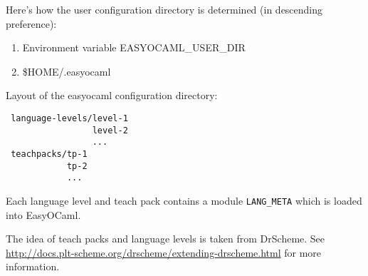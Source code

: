 Here's how the user configuration directory is determined (in descending 
preference):

\begin{enumerate}
    \item Environment variable EASYOCAML\_USER\_DIR
    \item \$HOME/.easyocaml
\end{enumerate}

Layout of the easyocaml configuration directory:

\begin{verbatim}
 language-levels/level-1
                 level-2
                 ...
 teachpacks/tp-1
            tp-2
            ...
\end{verbatim}

Each language level and teach pack contains a module \texttt{LANG\_META} 
which is loaded into EasyOCaml.

The idea of teach packs and language levels is taken from DrScheme.  See 
\href{http://docs.plt-scheme.org/drscheme/extending-drscheme.html}{http://docs.plt-scheme.org/drscheme/extending-drscheme.html}
for more information.




